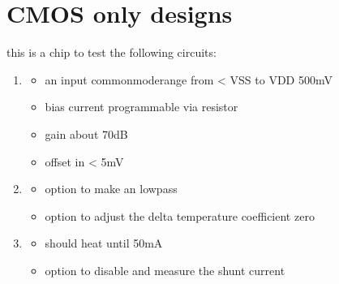 \documentclass[letterpaper,10pt,english]{sphinxmanual}
\begin{document}
\chapter{CMOS only designs}
\label{\detokenize{specification:cmos-only-designs}}\label{\detokenize{specification::doc}}
\sphinxAtStartPar
this is a chip to test the following circuits:
\begin{enumerate}
%
\item {} \begin{description}
\begin{itemize}
\item {} 
\sphinxAtStartPar
an input common\sphinxhyphen{}mode\sphinxhyphen{}range from \textless{} VSS to VDD \sphinxhyphen{} 500mV

\item {} 
\sphinxAtStartPar
bias current programmable via resistor

\item {} 
\sphinxAtStartPar
gain about 70dB

\item {} 
\sphinxAtStartPar
offset in \textless{} 5mV

\end{itemize}

\end{description}

\item {} \begin{description}
\begin{itemize}
\item {} 
\sphinxAtStartPar
option to make an low\sphinxhyphen{}pass

\item {} 
\sphinxAtStartPar
option to adjust the delta temperature coefficient zero

\end{itemize}

\end{description}

\item {} \begin{description}
\begin{itemize}
\item {} 
\sphinxAtStartPar
should heat until 50mA

\item {} 
\sphinxAtStartPar
option to disable and measure the shunt current


\end{itemize}
\end{description}
\end{enumerate}
\end{document}
